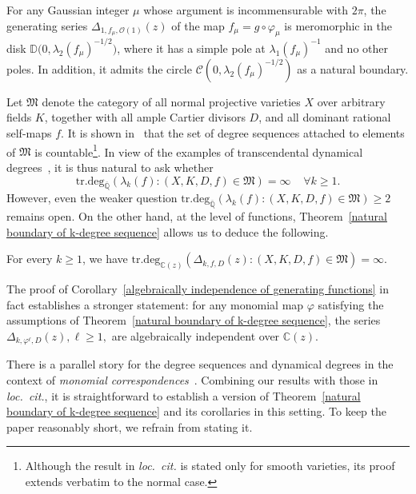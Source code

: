 \documentclass[11pt,a4paper]{article}
\theoremstyle{plain}
\theoremstyle{remark}
\theoremstyle{custombold}
\newenvironment{customcorollary}[1]
  {\renewcommand\theinnercustomcorollary{#1}\innercustomcorollary}
  {\endinnercustomcorollary}
\begin{document}
\begin{customcorollary}{B}\label{the example of BDJ} For any Gaussian integer $\mu$ whose argument is incommensurable with $2\pi$, the generating series $\Delta_{1,f_\mu,\mathcal{O}(1)}(z)$ of the map $f_\mu = g \circ \varphi_\mu$ is meromorphic in the disk $\mathbb{D}\bigl(0, \lambda_2(f_\mu)^{-1/2}\bigr)$, where it has a simple pole at $\lambda_1(f_\mu)^{-1}$ and no other poles. In addition, it admits the circle $\mathcal{C}(0, \lambda_{2}(f_\mu)^{-1/2})$ as a natural boundary.
\end{customcorollary}

Let $\mathfrak M$ denote the category of all normal projective varieties $X$ over arbitrary fields $K$, together with all ample Cartier divisors $D$, and all dominant rational self-maps $f$. It is shown in~\cite{Urech-2018} that the set of degree sequences attached to elements of $\mathfrak M$ is countable\footnote{Although the result in \emph{loc.~cit.} is stated only for smooth varieties, its proof extends verbatim to the normal case.}. In view of the examples of transcendental dynamical degrees~\cite{BDJ-2020,BDJK-2024,Sugimoto-2025}, it is thus natural to ask whether $$\mathrm{tr.deg}_{\overline{\mathbb Q}}(\lambda_k(f):(X,K,D,f)\in \mathfrak M)=\infty \;\;\;\; \forall k\geq1.$$ However, even the weaker question $\mathrm{tr.deg}_{\overline{\mathbb Q}}(\lambda_k(f):(X,K,D,f)\in \mathfrak M)\geq2$ remains open. On the other hand, at the level of functions, Theorem~\ref{natural boundary of k-degree sequence} allows us to deduce the following.

\begin{customcorollary}{C}\label{algebraically independence of generating functions}
For every $k\geq1$, we have $\mathrm{tr.deg}_{\mathbb C(z)}(\Delta_{k,f,D}(z):(X,K,D,f)\in \mathfrak M)=\infty.$
\end{customcorollary}

The proof of Corollary~\ref{algebraically independence of generating functions} in fact establishes a stronger statement: for any monomial map $\varphi$ satisfying the assumptions of Theorem~\ref{natural boundary of k-degree sequence}, the series $\Delta_{k,\varphi^\ell,D}(z), \ell\geq1,$ are algebraically independent over $\mathbb C(z)$. 


There is a parallel story for the degree sequences and dynamical degrees in the context of \emph{monomial correspondences}~\cite{Dang-Ramadas-2021}. Combining our results with those in \emph{loc.~cit.}, it is straightforward to establish a version of Theorem~\ref{natural boundary of k-degree sequence} and its corollaries in this setting. To keep the paper reasonably short, we refrain from stating it.
\end{document}
